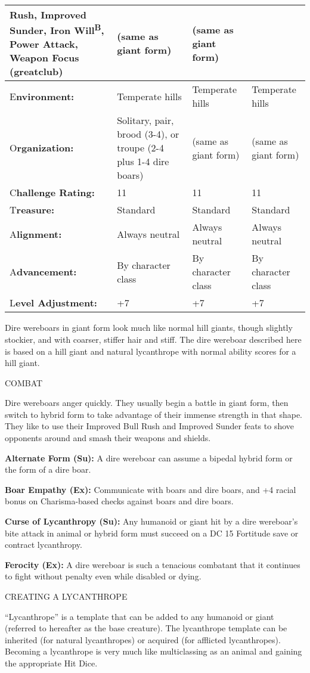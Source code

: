 \documentclass{article}
\begin{document}
\begin{tabular}{|>{\raggedright}p{67pt}|>{\raggedright}p{78pt}|>{\raggedright}p{78pt}|>{\raggedright}p{78pt}|}
Rush, Improved Sunder, Iron Will\textsuperscript{B}, Power Attack, Weapon Focus 
(greatclub) & (same as giant form) & (same as giant form)\tabularnewline
\hline
E\textbf{nvironment:} & Temperate hills & Temperate hills & Temperate hills\tabularnewline
\hline
O\textbf{rganization:} & Solitary, pair, brood (3-4), or troupe (2-4 plus 1-4 dire 
boars) & (same as giant form) & (same as giant form)\tabularnewline
\hline
C\textbf{hallenge Rating:} & 11 & 11 & 11\tabularnewline
\hline
T\textbf{reasure:} & Standard & Standard & Standard\tabularnewline
\hline
A\textbf{lignment:} & Always neutral & Always neutral & Always neutral\tabularnewline
\hline
A\textbf{dvancement:} & By character class & By character class & By character 
class\tabularnewline
\hline
L\textbf{evel Adjustment:} & +7 & +7 & +7\tabularnewline
\hline
\end{tabular}

Dire wereboars in giant form look much like normal hill giants, though slightly 
stockier, and with coarser, stiffer hair and stiff. The dire wereboar described 
here is based on a hill giant and natural lycanthrope with normal ability scores 
for a hill giant.

COMBAT

Dire wereboars anger quickly. They usually begin a battle in giant form, then switch 
to hybrid form to take advantage of their immense strength in that shape. They 
like to use their Improved Bull Rush and Improved Sunder feats to shove opponents 
around and smash their weapons and shields.

\textbf{Alternate Form (Su):} A dire wereboar can assume a bipedal hybrid form 
or the form of a dire boar.

\textbf{Boar Empathy (Ex): }Communicate with boars and dire boars, and +4 racial 
bonus on Charisma-based checks against boars and dire boars.

\textbf{Curse of Lycanthropy (Su): }Any humanoid or giant hit by a dire wereboar's 
bite attack in animal or hybrid form must succeed on a DC 15 Fortitude save or 
contract lycanthropy.

\textbf{Ferocity (Ex):} A dire wereboar is such a tenacious combatant that it continues 
to fight without penalty even while disabled or dying. 

\vspace{12pt}
CREATING A LYCANTHROPE

``Lycanthrope'' is a template that can be added to any humanoid or giant (referred 
to hereafter as the base creature). The lycanthrope template can be inherited (for 
natural lycanthropes) or acquired (for afflicted lycanthropes). Becoming a lycanthrope 
is very much like multiclassing as an animal and gaining the appropriate Hit Dice.
\end{document}
